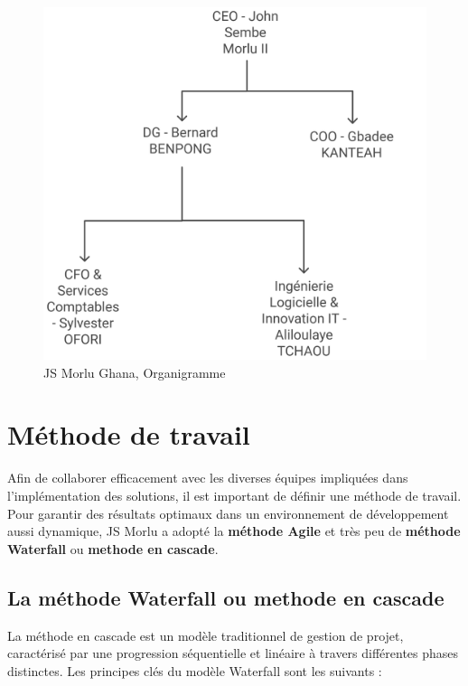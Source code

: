 \begin{figure}[H]
\begin{center}
\includegraphics[width=15cm]{assets/presentation/2_organigramme.png}
\end{center}
\caption{JS Morlu Ghana, Organigramme }
\end{figure}


\section{Méthode de travail}

Afin de collaborer efficacement avec les diverses équipes impliquées dans l'implémentation des solutions, il est important de définir une méthode de travail. Pour garantir des résultats optimaux dans un environnement de développement aussi dynamique, JS Morlu a adopté la \textbf{méthode Agile} et très peu de \textbf{méthode Waterfall} ou \textbf{methode en cascade}. 

\subsection*{La méthode Waterfall ou methode en cascade}
La méthode en cascade est un modèle traditionnel de gestion de projet, caractérisé par une progression séquentielle et linéaire à travers différentes phases distinctes. Les principes clés du modèle Waterfall sont les suivants :

